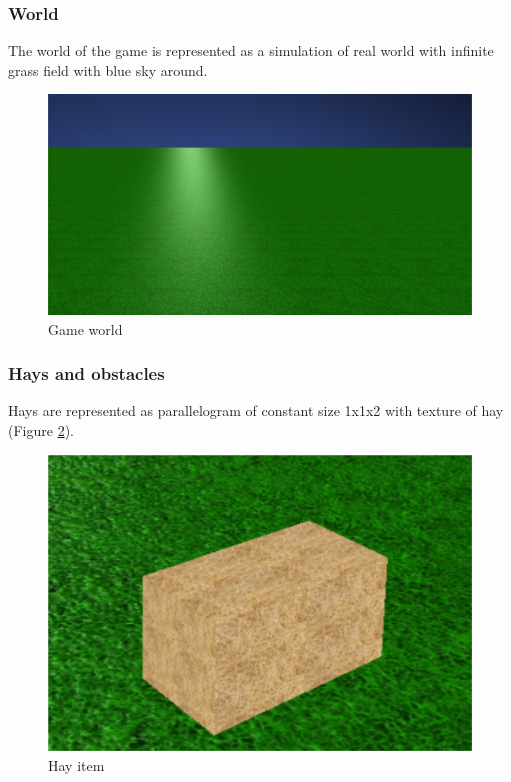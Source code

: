 \documentclass[12pt]{article}
\begin{document}
\subsubsection{World}
The world of the game is represented as a simulation of real world with infinite grass field with blue sky around.

\begin{figure}[h!]
\begin{center}
\includegraphics[scale=0.4]{images/env.jpg}
\end{center}
\caption{Game world}
\label{world}
\end{figure}

\subsubsection{Hays and obstacles}
Hays are represented as parallelogram of constant size 1x1x2 with texture of hay (Figure \ref{hay_item}).

\begin{figure}[h!]
\begin{center}
\includegraphics[scale=0.8]{images/hay.png}
\end{center}
\caption{Hay item}
\label{hay_item}
\end{figure}
\end{document}
